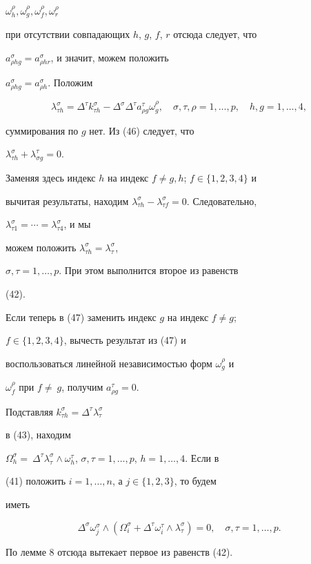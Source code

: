 \begin{pf}
$\omega^{\rho}_h,\omega^{\rho}_g,\omega^{\rho}_f,\omega^{\rho}_r$


при отсутствии совпадающих $h$, $g$, $f$, $r$ отсюда следует, что


$a^{\sigma}_{\rho hg}=a^{\sigma}_{\rho hr}$, и значит, можем положить


$a^{\sigma}_{\rho hg}=a^{\sigma}_{\rho h}$. Положим


\begin{equation}


\lambda^{\sigma}_{\tau h}=\Delta^{\tau}k^{\sigma}_{\tau h}-


\Delta^{\sigma}\Delta^{\tau}a^{\tau}_{\rho g}\omega^{\rho}_g,\quad


\sigma,\tau,\rho=1,\dotsc,p,\quad h,g=1,\dotsc,4,


\end{equation}


суммирования по $g$ нет. Из (46) следует, что


$\lambda^{\sigma}_{\tau h}+\lambda^{\tau}_{\sigma g}=0$.


Заменяя здесь индекс $h$ на индекс $f\ne g,h$; $f\in\{1,2,3,4\}$ и


вычитая результаты, находим $\lambda^{\sigma}_{\tau


h}-\lambda^{\sigma}_{\tau f}=0$. Следовательно,


$\lambda^{\sigma}_{\tau1}=\dotsb=\lambda^{\sigma}_{\tau4}$, и мы


можем положить $\lambda^{\sigma}_{\tau h}=\lambda^{\sigma}_{\tau}$,


$\sigma,\tau=1,\dotsc,p$. При этом выполнится второе из равенств


(42).





Если теперь в (47) заменить индекс $g$ на индекс $f\ne g$;


$f\in\{1,2,3,4\}$, вычесть результат из (47) и


воспользоваться линейной независимостью форм $\omega^{\rho}_g$ и


$\omega^{\rho}_f$ при $f\ne~g$, получим $a^{\tau}_{\rho g}=0$.


Подставляя $k^{\sigma}_{\tau h}=\Delta^{\tau}\lambda^{\sigma}_{\tau}$


в (43), находим


$\Omega^{\sigma}_h=~\Delta^{\tau}\lambda^{\sigma}_{\tau}\wedge


\omega^{\tau}_h$, $\sigma,\tau=1,\dotsc,p$, $h=1,\dotsc,4$. Если в


(41) положить $i=1,\dotsc,n$, а $j\in\{1,2,3\}$, то будем


иметь


$$


\Delta^{\sigma}\omega^{\sigma}_j\wedge(\Omega^{\sigma}_i+


\Delta^{\tau}\omega^{\tau}_i\wedge\lambda^{\sigma}_{\tau})=0,\quad


\sigma,\tau=1,\dotsc,p.


$$


По лемме 8 отсюда вытекает первое из равенств (42).


\end{pf}
